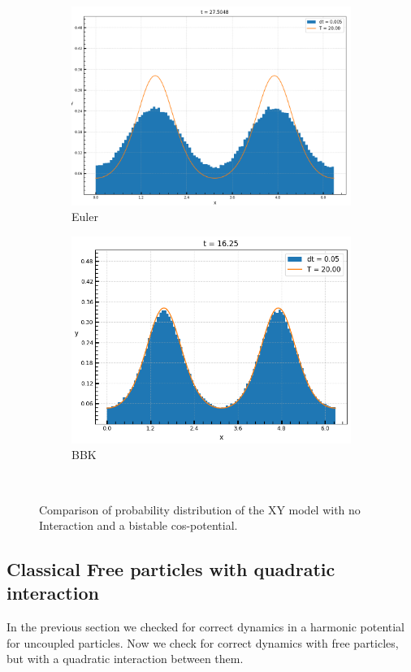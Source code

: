 	\begin{figure}[htp]
		\begin{subfigure}{0.5\textwidth}
			\centering
			\includegraphics[width=0.8\linewidth]{graphics/Distribution-Euler-0.005.png}
			\caption{Euler}
		\end{subfigure}
		\begin{subfigure}{0.5\textwidth}
			\centering
			\includegraphics[width=0.8\linewidth]{graphics/Distribution-BBK-0.05.png}
			\caption{BBK}
		\end{subfigure}  \\
		\label{Dist-Comparison}
		\caption{Comparison of probability distribution of the XY model with no Interaction and a bistable cos-potential.}
	\end{figure}
	\subsection{Classical Free particles with quadratic interaction}
	In the previous section we checked for correct dynamics in a harmonic potential for uncoupled particles. Now we check for correct dynamics with free particles, but with a quadratic interaction between them.
	
